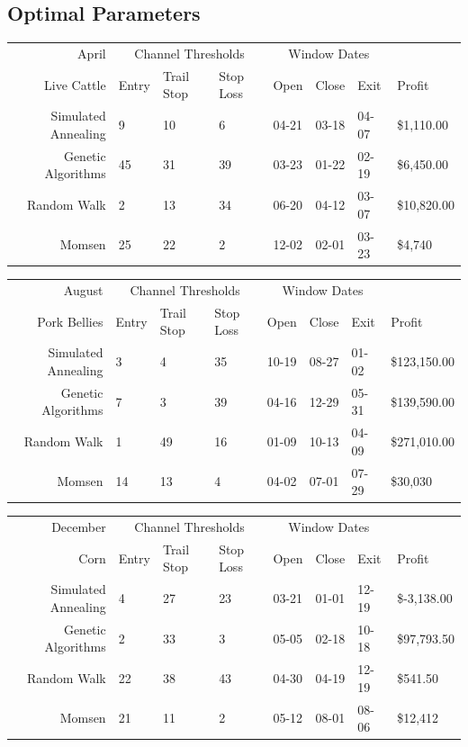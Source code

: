 \documentclass[12pt]{article}
\begin{document}
\pagebreak
\subsection{Optimal Parameters}

\begin{tabular}{|r|l|l|l|l|l|l|l|}
  \hline
  April & \multicolumn{3}{|c|}{Channel Thresholds} & \multicolumn{3}{|c|}{Window Dates} &  \\
  Live Cattle & Entry & Trail Stop & Stop Loss & Open & Close & Exit & Profit\\ \hline
  Simulated Annealing & 9 & 10 & 6 & 04-21 & 03-18 & 04-07 & \$1,110.00 \\ \hline
  Genetic Algorithms & 45 & 31 & 39 & 03-23 & 01-22 & 02-19 & \$6,450.00 \\ \hline
  Random Walk & 2 & 13 & 34 & 06-20 & 04-12 & 03-07 & \$10,820.00 \\ \hline
  Momsen & 25 & 22 & 2 & 12-02 & 02-01 & 03-23 & \$4,740 \\ \hline
\end{tabular}

\begin{tabular}{|r|l|l|l|l|l|l|l|}
  \hline
  August & \multicolumn{3}{|c|}{Channel Thresholds} & \multicolumn{3}{|c|}{Window Dates} &  \\
  Pork Bellies & Entry & Trail Stop & Stop Loss & Open & Close & Exit & Profit\\ \hline
  Simulated Annealing & 3 & 4 & 35 & 10-19 & 08-27 & 01-02 & \$123,150.00 \\ \hline
  Genetic Algorithms & 7 & 3 & 39 & 04-16 & 12-29 & 05-31 & \$139,590.00 \\ \hline
  Random Walk & 1 & 49 & 16 & 01-09 & 10-13 & 04-09 & \$271,010.00 \\ \hline
  Momsen &  14 & 13 & 4 & 04-02 & 07-01 & 07-29 & \$30,030 \\ \hline
\end{tabular}

\begin{tabular}{|r|l|l|l|l|l|l|l|}
  \hline
  December & \multicolumn{3}{|c|}{Channel Thresholds} & \multicolumn{3}{|c|}{Window Dates} &  \\
  Corn & Entry & Trail Stop & Stop Loss & Open & Close & Exit & Profit\\ \hline
  Simulated Annealing & 4 & 27 & 23 & 03-21 & 01-01 & 12-19 & \$-3,138.00 \\ \hline
  Genetic Algorithms & 2 & 33 & 3 & 05-05 & 02-18 & 10-18 & \$97,793.50 \\ \hline
  Random Walk & 22 & 38 & 43 & 04-30 & 04-19 & 12-19 & \$541.50 \\ \hline
  Momsen & 21 & 11 & 2 & 05-12 & 08-01 & 08-06 & \$12,412 \\ \hline
\end{tabular}
\end{document}
